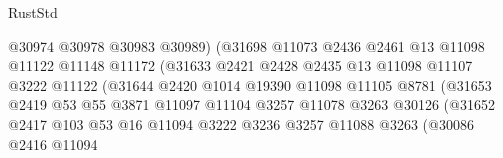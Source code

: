 \begin{lexlean}{RustStd}
\begin{coremodule}
                                      @30974
                                      @30978
                                      @30983
                                      @30989)
                                    (@31698
                                      @11073
                                      @2436
                                      @2461
                                      @13
                                      @11098
                                      @11122
                                      @11148
                                      @11172
                                      (@31633
                                        @2421
                                        @2428
                                        @2435
                                        @13
                                        @11098
                                        @11107
                                        @3222
                                        @11122
                                        (@31644
                                          @2420
                                          @1014
                                          @19390
                                          @11098
                                          @11105
                                          @8781
                                          (@31653
                                            @2419
                                            @53
                                            @55
                                            @3871
                                            @11097
                                            @11104
                                            @3257
                                            @11078
                                            @3263
                                            @30126
                                            (@31652
                                              @2417
                                              @103
                                              @53
                                              @16
                                              @11094
                                              @3222
                                              @3236
                                              @3257
                                              @11088
                                              @3263
                                              (@30086
                                                @2416
                                                @11094

\end{coremodule}
\end{lexlean}
